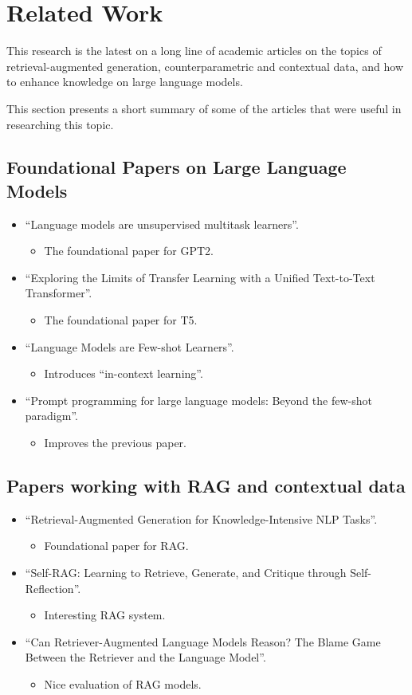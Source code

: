 \section{Related Work}

This research is the latest on a long line of academic articles on the topics of retrieval-augmented generation, counterparametric and contextual data, and how to enhance knowledge on large language models.

This section presents a short summary of some of the articles that were useful in researching this topic.


\subsection{Foundational Papers on Large Language Models}
\newcommand{\mart}[1]{\begin{itemize} \item #1 \end{itemize}}
\begin{itemize}
	\item ``Language models are unsupervised multitask learners''\citep{gpt2}.
		\mart{The foundational paper for GPT2.}
	\item ``Exploring the Limits of Transfer Learning with a Unified Text-to-Text Transformer''\cite{t5}.
		\mart{The foundational paper for T5.}
	\item ``Language Models are Few-shot Learners''\cite{fewshotlearners}.
		\mart{Introduces ``in-context learning''.}
	\item ``Prompt programming for large language models: Beyond the few-shot paradigm''\cite{beyondfewshot}.
		\mart{Improves the previous paper.}
\end{itemize}

\subsection{Papers working with RAG and contextual data}
\begin{itemize}
	\item ``Retrieval-Augmented Generation for Knowledge-Intensive NLP Tasks''\cite{rag}.
		\mart{Foundational paper for RAG.}
	\item ``Self-RAG: Learning to Retrieve, Generate, and Critique through Self-Reflection''\cite{selfrag}.
		\mart{Interesting RAG system.}
	\item ``Can Retriever-Augmented Language Models Reason? The Blame Game Between the Retriever and the Language Model''\cite{can_rag_models_reason}.
		\mart{Nice evaluation of RAG models.}
\end{itemize}

